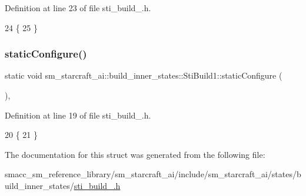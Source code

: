 Definition at line 23 of file sti\+\_\+build\+\_.\+h.


\begin{DoxyCode}
24   \{
25   \}
\end{DoxyCode}
\mbox{\label{structsm__starcraft__ai_1_1build__inner__states_1_1StiBuild1_a7450c65f49b3622ca6b2075b854c0c0f}} 
\subsubsection{\texorpdfstring{static\+Configure()}{staticConfigure()}}
{\footnotesize\ttfamily static void sm\+\_\+starcraft\+\_\+ai\+::build\+\_\+inner\+\_\+states\+::\+Sti\+Build1\+::static\+Configure (\begin{DoxyParamCaption}{ }\end{DoxyParamCaption})\hspace{0.3cm}{\ttfamily [inline]}, {\ttfamily [static]}}



Definition at line 19 of file sti\+\_\+build\+\_.\+h.


\begin{DoxyCode}
20   \{
21   \}
\end{DoxyCode}


The documentation for this struct was generated from the following file\+:\begin{DoxyCompactItemize}
\item 
smacc\+\_\+sm\+\_\+reference\+\_\+library/sm\+\_\+starcraft\+\_\+ai/include/sm\+\_\+starcraft\+\_\+ai/states/build\+\_\+inner\+\_\+states/\hyperlink{sti__build__1_8h}{sti\+\_\+build\+\_.\+h}\end{DoxyCompactItemize}
